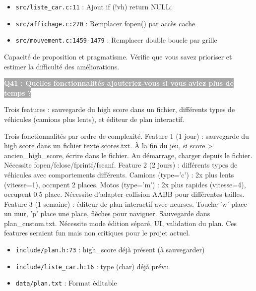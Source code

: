 \documentclass[12pt,a4paper]{article}
\newcommand{\question}[1]{%
    \vspace{0.5cm}
    \noindent\colorbox{darkgray}{\textcolor{white}{\textbf{#1}}}
    \vspace{0.3cm}
}
\begin{document}
\begin{reference_code}
\begin{itemize}
    \item \texttt{src/liste\_car.c:11} : Ajout if (!vh) return NULL;
    \item \texttt{src/affichage.c:270} : Remplacer fopen() par accès cache
    \item \texttt{src/mouvement.c:1459-1479} : Remplacer double boucle par grille
\end{itemize}
\end{reference_code}

\begin{objectif_prof}
Capacité de proposition et pragmatisme. Vérifie que vous savez prioriser et estimer la difficulté des améliorations.
\end{objectif_prof}

\question{Q41 : Quelles fonctionnalités ajouteriez-vous si vous aviez plus de temps ?}

\begin{reponse_courte}
Trois features : sauvegarde du high score dans un fichier, différents types de véhicules (camions plus lents), et éditeur de plan interactif.
\end{reponse_courte}

\begin{reponse_longue}
Trois fonctionnalités par ordre de complexité. Feature 1 (1 jour) : sauvegarde du high score dans un fichier texte scores.txt. À la fin du jeu, si score > ancien\_high\_score, écrire dans le fichier. Au démarrage, charger depuis le fichier. Nécessite fopen/fclose/fprintf/fscanf. Feature 2 (2 jours) : différents types de véhicules avec comportements différents. Camions (type='c') : 2x plus lents (vitesse=1), occupent 2 places. Motos (type='m') : 2x plus rapides (vitesse=4), occupent 0.5 place. Nécessite d'adapter collision AABB pour différentes tailles. Feature 3 (1 semaine) : éditeur de plan interactif avec ncurses. Touche 'w' place un mur, 'p' place une place, flèches pour naviguer. Sauvegarde dans plan\_custom.txt. Nécessite mode édition séparé, UI, validation du plan. Ces features seraient fun mais non critiques pour le projet actuel.
\end{reponse_longue}

\begin{reference_code}
\begin{itemize}
    \item \texttt{include/plan.h:73} : high\_score déjà présent (à sauvegarder)
    \item \texttt{include/liste\_car.h:16} : type (char) déjà prévu
    \item \texttt{data/plan.txt} : Format éditable
\end{itemize}
\end{reference_code}
\end{document}
